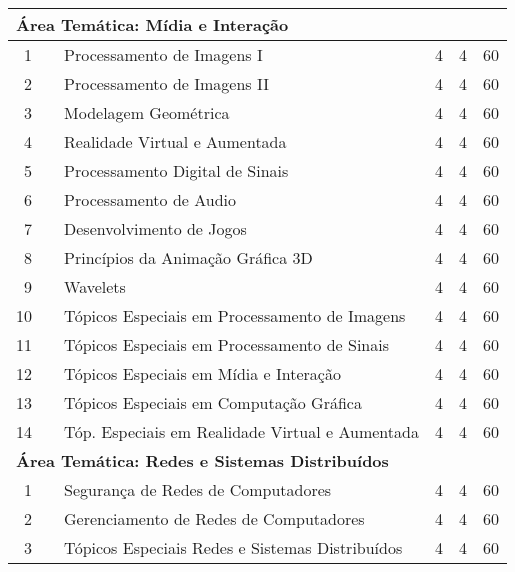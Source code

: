 \documentclass[
	12pt,				%
	openright,			%
  oneside,     %
	a4paper,			%
	english,			%
	french,				%
	spanish,			%
	brazil				%
	]{abntex2}
\begin{document}
\begin{apendicesenv}
\begin{longtable}{r|r|l|r|r|r}
\multicolumn{6}{l}{\textbf{Área Temática: Mídia e Interação}} \\ \hline
    1     &       & Processamento de Imagens I & 4     & 4     & 60 \\ \hline
    2     &       & Processamento de Imagens II & 4     & 4     & 60 \\ \hline
    3     &       & Modelagem Geométrica & 4     & 4     & 60 \\ \hline 
    4     &       & Realidade Virtual e Aumentada & 4     & 4     & 60 \\ \hline 
    5     &       & Processamento Digital de Sinais & 4     & 4     & 60 \\ \hline
    6     &       & Processamento de Audio & 4     & 4     & 60 \\ \hline
    7     &       & Desenvolvimento de Jogos & 4     & 4     & 60 \\ \hline
    8     &       & Princípios da Animação Gráfica 3D & 4     & 4     & 60 \\ \hline
    9     &       & Wavelets & 4     & 4     & 60 \\ \hline
   10     &       & \small{Tópicos Especiais em Processamento de Imagens} & 4     & 4     & 60 \\ \hline
   11     &       & \small{Tópicos Especiais em Processamento de Sinais} & 4     & 4     & 60 \\ \hline
   12     &       & \small{Tópicos Especiais em Mídia e Interação} & 4     & 4     & 60 \\ \hline
   13     &       & \small{Tópicos Especiais em Computação Gráfica} & 4     & 4     & 60 \\ \hline
   14     &       & \small{Tóp. Especiais em Realidade Virtual e Aumentada} & 4     & 4     & 60 \\ \hline

\multicolumn{6}{l}{\textbf{Área Temática: Redes e Sistemas Distribuídos}} \\ \hline
    1     &       & Segurança de Redes de Computadores & 4     & 4     & 60 \\ \hline
    2     &       & Gerenciamento de Redes de Computadores & 4     & 4     & 60 \\ \hline
    3     &       & \small{Tópicos Especiais Redes e Sistemas Distribuídos} & 4     & 4     & 60 \\ \hline


\end{longtable}
\end{apendicesenv}
\end{document}
